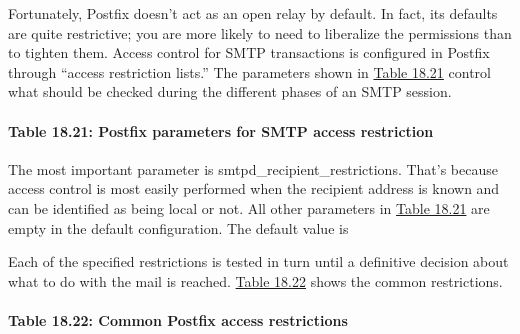 Fortunately, Postfix doesn't act as an open relay by default. In fact,
its defaults are quite restrictive; you are more likely to need to
liberalize the permissions than to tighten them. Access control for SMTP
transactions is configured in Postfix through ``access restriction
lists.'' The parameters shown in
\protect\hyperlink{part0026_split_063.htmlux5cux23_idTextAnchor1188}{Table
18.21} control what should be checked during the different phases of an
SMTP session.

\paragraph[{Table 18.21: }Postfix parameters for SMTP access
restriction]{\texorpdfstring{{Table 18.21:
}\protect\hypertarget{part0026_split_063.htmlux5cux23_idTextAnchor1188}{}{}Postfix
parameters for SMTP access
restriction{\protect\hypertarget{part0026_split_063.htmlux5cux23_idIndexMarker2727}{}{}}}{Table 18.21: Postfix parameters for SMTP access restriction}}


The most important parameter is {smtpd\_recipient\_restrictions}. That's
because access control is most easily performed when the recipient
address is known and can be identified as being local or not. All other
parameters in
\protect\hyperlink{part0026_split_063.htmlux5cux23_idTextAnchor1188}{Table
18.21} are empty in the default configuration. The default value is


Each of the specified restrictions is tested in turn until a definitive
decision about what to do with the mail is reached.
\protect\hyperlink{part0026_split_063.htmlux5cux23_idTextAnchor1189}{Table
18.22} shows the common restrictions.

\paragraph[{Table 18.22: }Common Postfix access
restrictions]{\texorpdfstring{{Table 18.22:
}\protect\hypertarget{part0026_split_063.htmlux5cux23_idTextAnchor1189}{}{}\protect\hypertarget{part0026_split_063.htmlux5cux23_idTextAnchor1190}{}{}Common
Postfix access
restrictions{\protect\hypertarget{part0026_split_063.htmlux5cux23_idIndexMarker2728}{}{}\protect\hypertarget{part0026_split_063.htmlux5cux23_idIndexMarker2729}{}{}\protect\hypertarget{part0026_split_063.htmlux5cux23_idIndexMarker2730}{}{}}}{Table 18.22: Common Postfix access restrictions}}

